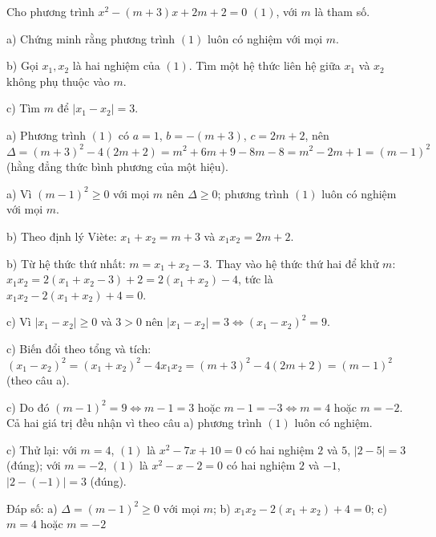 \begin{problem}[9DS-PT2-018]
Cho phương trình $x^2 - (m + 3)x + 2m + 2 = 0$ $(1)$, với $m$ là tham số.

a) Chứng minh rằng phương trình $(1)$ luôn có nghiệm với mọi $m$.

b) Gọi $x_1, x_2$ là hai nghiệm của $(1)$. Tìm một hệ thức liên hệ giữa $x_1$ và $x_2$ không phụ thuộc vào $m$.

c) Tìm $m$ để $|x_1 - x_2| = 3$.

\begin{solution}
a) Phương trình $(1)$ có $a = 1$, $b = -(m + 3)$, $c = 2m + 2$, nên $\Delta = (m + 3)^2 - 4(2m + 2) = m^2 + 6m + 9 - 8m - 8 = m^2 - 2m + 1 = (m - 1)^2$ (hằng đẳng thức bình phương của một hiệu).

a) Vì $(m - 1)^2 \geq 0$ với mọi $m$ nên $\Delta \geq 0$; phương trình $(1)$ luôn có nghiệm với mọi $m$.

b) Theo định lý Viète: $x_1 + x_2 = m + 3$ và $x_1 x_2 = 2m + 2$.

b) Từ hệ thức thứ nhất: $m = x_1 + x_2 - 3$. Thay vào hệ thức thứ hai để khử $m$: $x_1 x_2 = 2(x_1 + x_2 - 3) + 2 = 2(x_1 + x_2) - 4$, tức là $x_1 x_2 - 2(x_1 + x_2) + 4 = 0$.

c) Vì $|x_1 - x_2| \geq 0$ và $3 > 0$ nên $|x_1 - x_2| = 3 \Leftrightarrow (x_1 - x_2)^2 = 9$.

c) Biến đổi theo tổng và tích: $(x_1 - x_2)^2 = (x_1 + x_2)^2 - 4x_1x_2 = (m + 3)^2 - 4(2m + 2) = (m - 1)^2$ (theo câu a).

c) Do đó $(m - 1)^2 = 9 \Leftrightarrow m - 1 = 3$ hoặc $m - 1 = -3 \Leftrightarrow m = 4$ hoặc $m = -2$. Cả hai giá trị đều nhận vì theo câu a) phương trình $(1)$ luôn có nghiệm.

c) Thử lại: với $m = 4$, $(1)$ là $x^2 - 7x + 10 = 0$ có hai nghiệm $2$ và $5$, $|2 - 5| = 3$ (đúng); với $m = -2$, $(1)$ là $x^2 - x - 2 = 0$ có hai nghiệm $2$ và $-1$, $|2 - (-1)| = 3$ (đúng).

Đáp số: a) $\boxed{\Delta = (m - 1)^2 \geq 0 \text{ với mọi } m}$; b) $\boxed{x_1x_2 - 2(x_1 + x_2) + 4 = 0}$; c) $\boxed{m = 4 \text{ hoặc } m = -2}$
\end{solution}
\end{problem}

